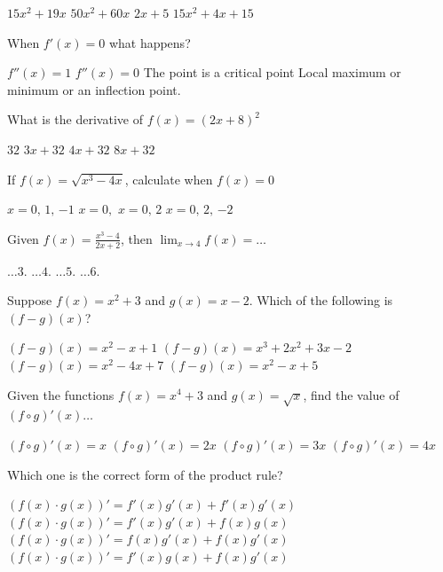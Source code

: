 \documentclass{exam}
\begin{document}
\begin{questions}
	\begin{choices}
		\choice $15 x^{2} + 19 x$
		\choice $50 x^{2} + 60 x$
		\choice $2 x + 5$
		\CorrectChoice $15 x^{2} + 4 x + 15$
	\end{choices}
	\question When $f'(x) = 0$ what happens?

	\begin{choices}
		\choice $f''(x) = 1$
		\choice $f''(x) = 0 $
		\CorrectChoice The point is a critical  point
		\choice Local maximum or minimum or an inflection point.
	\end{choices}
	\question What is the derivative of $f(x) = (2x+8)^2$

	\begin{choices}
		\choice $32$
		\choice $3x+32$
		\choice $4x+32$
		\CorrectChoice $8x+32$
	\end{choices}

	\question If $f(x) =\sqrt{x^3 - 4x}$, calculate when $f(x)=0 $

	\begin{choices}
		\choice $x = 0,\,1,\,{-1}$
		\choice $x= 0, $
		\choice $x= 0,\,2 $
		\CorrectChoice$ x= 0,\,2,\,{-2} $
	\end{choices}
	\question Given $f(x) = \frac{x^3-4}{2x+2}$, then $\lim_{x\to 4} f(x) = \ldots$

	\begin{choices}
		\choice $\ldots3.$
		\choice $\ldots4.$
		\choice $\ldots5.$
		\CorrectChoice $\ldots6.$
	\end{choices}
	\question  Suppose $f(x) = x^2 + 3$  and $g(x) = x - 2$. Which of the following is  $(f-g)(x)$?

	\begin{choices}
		\choice  $(f-g)(x)=x^2 - x +1$
     	\choice  $(f-g)(x)=x^3 + 2x^2 + 3x -2$
		\choice  $(f-g)(x)=x^2 - 4x + 7$
		\CorrectChoice   $(f-g)(x)=x^2 - x + 5$
	\end{choices}

	\question Given the functions $f(x) = x^4+3$ and $g(x) = \sqrt{x}$, find the value of $(f\circ g)'(x)\ldots$

	\begin{choices}
		\choice $(f\circ g)'(x) = x$
		\CorrectChoice $(f\circ g)'(x) = 2x$
		\choice $(f\circ g)'(x) = 3x$
		\choice $(f\circ g)'(x) = 4x$
	\end{choices}
	\question Which one is the correct form of the product rule?

	\begin{choices}
		\choice $(f(x)\cdot g(x))' = f'(x)g'(x)+f'(x)g'(x)$
		\choice $(f(x)\cdot g(x))' = f'(x)g'(x)+f(x)g(x)$
		\choice $(f(x)\cdot g(x))' = f(x)g'(x)+f(x)g'(x)$
		\CorrectChoice $(f(x)\cdot g(x))' = f'(x)g(x) + f(x)g'(x)$
	\end{choices}


\end{questions}
\end{document}

